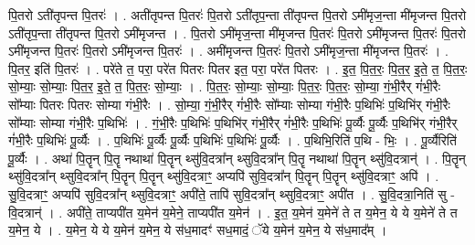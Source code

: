 \documentclass[17pt]{extarticle}
\begin{document}
पि॒तरो ऽती॑तृपन्त पि॒तरः॑ । . अती॑तृपन्त पि॒तरः॑ पि॒तरो ऽती॑तृप॒न्ता ती॑तृपन्त पि॒तरो ऽमी॑मृज॒न्ता मी॑मृजन्त पि॒तरो ऽती॑तृप॒न्ता ती॑तृपन्त पि॒तरो ऽमी॑मृजन्त । . पि॒तरो ऽमी॑मृज॒न्ता मी॑मृजन्त पि॒तरः॑ पि॒तरो ऽमी॑मृजन्त पि॒तरः॑ पि॒तरो ऽमी॑मृजन्त पि॒तरः॑ पि॒तरो ऽमी॑मृजन्त पि॒तरः॑ । . अमी॑मृजन्त पि॒तरः॑ पि॒तरो ऽमी॑मृज॒न्ता मी॑मृजन्त पि॒तरः॑ । . पि॒तर॒ इति॑ पि॒तरः॑ । . परे॑ते त॒ परा॒ परे॑त पितरः पितर इत॒ परा॒ परे॑त पितरः । . इ॒त॒ पि॒त॒रः॒ पि॒त॒र॒ इ॒ते॒ त॒ पि॒त॒रः॒ सो॒म्याः॒ सो॒म्याः॒ पि॒त॒र॒ इ॒ते॒ त॒ पि॒त॒रः॒ सो॒म्याः॒ । . पि॒त॒रः॒ सो॒म्याः॒ सो॒म्याः॒ पि॒त॒रः॒ पि॒त॒रः॒ सो॒म्या॒ गं॒भी॒रैर् गं॑भी॒रैः सो᳚म्याः पितरः पितरः सोम्या गंभी॒रैः । . सो॒म्या॒ गं॒भी॒रैर् गं॑भी॒रैः सो᳚म्याः सोम्या गंभी॒रैः प॒थिभिः॑ प॒थिभि॑र् गंभी॒रैः सो᳚म्याः सोम्या गंभी॒रैः प॒थिभिः॑ । . गं॒भी॒रैः प॒थिभिः॑ प॒थिभि॑र् गंभी॒रैर् गं॑भी॒रैः प॒थिभिः॑ पू॒र्व्यैः पू॒र्व्यैः प॒थिभि॑र् गंभी॒रैर् गं॑भी॒रैः प॒थिभिः॑ पू॒र्व्यैः । . प॒थिभिः॑ पू॒र्व्यैः पू॒र्व्यैः प॒थिभिः॑ प॒थिभिः॑ पू॒र्व्यैः । . प॒थिभि॒रिति॑ प॒थि - भिः॒ । . पू॒र्व्यैरिति॑ पू॒र्व्यैः । . अथा॑ पि॒तॄन् पि॒तॄ नथाथा॑ पि॒तॄन् थ्सु॑वि॒दत्रा᳚न् थ्सुवि॒दत्रा᳚न् पि॒तॄ नथाथा॑ पि॒तॄन् थ्सु॑वि॒दत्रान्॑ । . पि॒तॄन् थ्सु॑वि॒दत्रा᳚न् थ्सुवि॒दत्रा᳚न् पि॒तॄन् पि॒तॄन् थ्सु॑वि॒दत्राꣳ॒॒ अप्यपि॑ सुवि॒दत्रा᳚न् पि॒तॄन् पि॒तॄन् थ्सु॑वि॒दत्राꣳ॒॒ अपि॑ । . सु॒वि॒दत्राꣳ॒॒ अप्यपि॑ सुवि॒दत्रा᳚न् थ्सुवि॒दत्राꣳ॒॒ अपी॑ते॒ तापि॑ सुवि॒दत्रा᳚न् थ्सुवि॒दत्राꣳ॒॒ अपी॑त । . सु॒वि॒दत्रा॒निति॑ सु - वि॒दत्रान्॑ । . अपी॑ते॒ ताप्यपी॑त य॒मेन॑ य॒मेने॒ ताप्यपी॑त य॒मेन॑ । . इ॒त॒ य॒मेन॑ य॒मेने॑ ते त य॒मेन॒ ये ये य॒मेने॑ ते त य॒मेन॒ ये । . य॒मेन॒ ये ये य॒मेन॑ य॒मेन॒ ये स॑ध॒मादꣳ॑ सध॒मादं॒ ॅये य॒मेन॑ य॒मेन॒ ये स॑ध॒माद᳚म् । \newline
\end{document}
